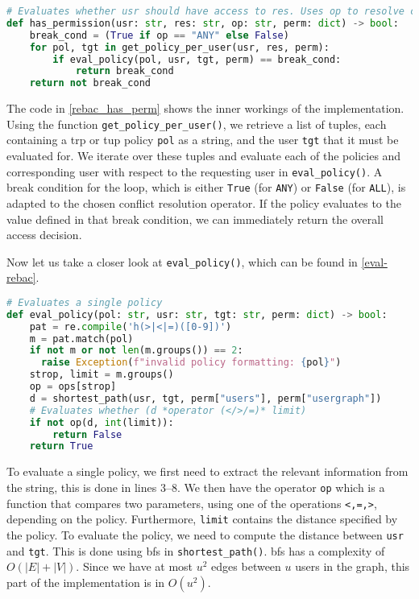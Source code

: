\documentclass{semdoc}
\begin{document}
\begin{lstlisting}[float, language=python, label={rebac_has_perm}, caption={\texttt{has\_permission()} function for the ReBAC instance}]
# Evaluates whether usr should have access to res. Uses op to resolve conflicting policy decisions.
def has_permission(usr: str, res: str, op: str, perm: dict) -> bool: 
    break_cond = (True if op == "ANY" else False) 
    for pol, tgt in get_policy_per_user(usr, res, perm):
        if eval_policy(pol, usr, tgt, perm) == break_cond:
            return break_cond
    return not break_cond 
\end{lstlisting}

The code in \cref{rebac_has_perm} shows the inner workings of the implementation. 
Using the function \texttt{get\_policy\_per\_user()}, we retrieve a list of tuples, each containing a \gls{trp} or \gls{tup} policy \texttt{pol} as a string, and the user \texttt{tgt} that it must be evaluated for.
We iterate over these tuples and evaluate each of the policies and corresponding user with respect to the requesting user in \texttt{eval\_policy()}. 
A break condition for the loop, which is either \texttt{True} (for \texttt{ANY}) or \texttt{False} (for \texttt{ALL}), is adapted to the chosen conflict resolution operator.
If the policy evaluates to the value defined in that break condition, we can immediately return the overall access decision.

Now let us take a closer look at \texttt{eval\_policy()}, which can be found in \cref{eval-rebac}.

\begin{lstlisting}[float, language=python, label={eval-rebac}, caption={\texttt{eval\_policy()} function for the ReBAC instance}]
# Evaluates a single policy
def eval_policy(pol: str, usr: str, tgt: str, perm: dict) -> bool:
    pat = re.compile('h(>|<|=)([0-9])') 
    m = pat.match(pol)
    if not m or not len(m.groups()) == 2:
      raise Exception(f"invalid policy formatting: {pol}")
    strop, limit = m.groups() 
    op = ops[strop]
    d = shortest_path(usr, tgt, perm["users"], perm["usergraph"])
    # Evaluates whether (d *operator (</>/=)* limit)
    if not op(d, int(limit)):
        return False
    return True
\end{lstlisting}

To evaluate a single policy, we first need to extract the relevant information from the string, this is done in lines 3--8. 
We then have the operator \texttt{op} which is a function that compares two parameters, using one of the operations \texttt{<,=,>}, depending on the policy. Furthermore, \texttt{limit} contains the distance specified by the policy.
To evaluate the policy, we need to compute the distance between \texttt{usr} and \texttt{tgt}. This is done using \gls{bfs} in \texttt{shortest\_path()}. 
\gls{bfs} has a complexity of $O(|E|+|V|)$. Since we have at most $u^2$ edges between $u$ users in the graph, this part of the implementation is in $O(u^2)$.
\end{document}
